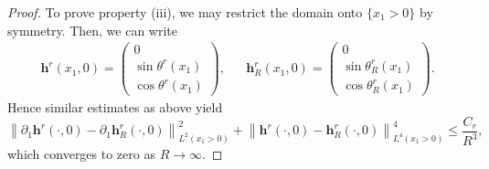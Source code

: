 \documentclass{amsart}
\numberwithin{equation}{section}
\theoremstyle{definition}
\theoremstyle{remark}
\newtheorem{remark}[theorem]{Remark}
\newcommand{\R}{\mathbb{R}}
\newcommand{\te}{\ensuremath{\theta}}
\newcommand{\nor}[2]{\left\| {#1} \right\|_{#2}}		%
\newcommand{\rd}{{\partial}}								%
\newcommand{\bh}{{\mathbf{h}}}
\newcommand{\boe}{{\mathbf{e}}}
\begin{document}
\begin{proof}
To prove property (iii), we may restrict the domain onto $\{x_1>0\}$ by symmetry. Then, we can write
\begin{align*}
\bh^r (x_1,0) = 
\begin{pmatrix}
0 \\ \sin \te^{r} (x_1) 
\\ \cos \te^r(x_1)
\end{pmatrix}
,&&
\bh^r_R (x_1,0) = 
\begin{pmatrix}
0 \\ \sin \te^{r}_R (x_1) 
\\ \cos \te^r_R(x_1)
\end{pmatrix}
.
\end{align*}
Hence similar estimates as above yield
$$
\nor{\rd_1\bh^r(\cdot ,0)- \rd_1\bh^r_R(\cdot ,0)}{L^2(x_1>0)}^2
+ 
\nor{\bh^r(\cdot ,0)- \bh^r_R(\cdot ,0)}{L^4(x_1>0)}^4 \le \frac{C_r}{R^3},
$$
which converges to zero as $R\to\infty$.
\end{proof}



\end{document}

